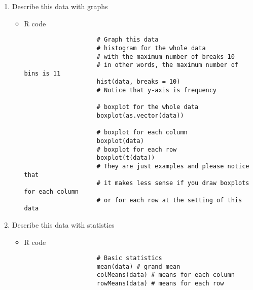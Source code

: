 \begin{enumerate}
\begin{itemize}
\begin{verbatim}
				# Show the data
				data
				\end{verbatim}
			\newpage \item R code (Directly inputing into R)
				\begin{verbatim}
					# Directly input a data as a matrix
					data <- matrix(c(
					74.03	,	74.002	,	74.019	,	73.992	,	74.008	,
					73.995	,	73.992	,	74.001	,	74.011	,	74.004	,
					73.988	,	74.024	,	74.021	,	74.005	,	74.002	,
					74.002	,	73.996	,	73.993	,	74.015	,	74.009	,
					73.992	,	74.007	,	74.015	,	73.989	,	74.014	,
					74.009	,	73.994	,	73.997	,	73.985	,	73.993	,
					73.995	,	74.006	,	73.994	,	74	,	74.005	,
					73.985	,	74.003	,	73.993	,	74.015	,	73.988	,
					74.008	,	73.995	,	74.009	,	74.005	,	74.004	,
					73.998	,	74	,	73.99	,	74.007	,	73.995	,
					73.994	,	73.998	,	73.994	,	73.995	,	73.99	,
					74.004	,	74	,	74.007	,	74	,	73.996	,
					73.983	,	74.002	,	73.998	,	73.997	,	74.012	,
					74.006	,	73.967	,	73.994	,	74	,	73.984	,
					74.012	,	74.014	,	73.998	,	73.999	,	74.007	,
					74	,	73.984	,	74.005	,	73.998	,	73.996	,
					73.994	,	74.012	,	73.986	,	74.005	,	74.007	,
					74.006	,	74.01	,	74.018	,	74.003	,	74	,
					73.984	,	74.002	,	74.003	,	74.005	,	73.997	,
					74	,	74.01	,	74.013	,	74.02	,	74.003	,
					73.982	,	74.001	,	74.015	,	74.005	,	73.996	,
					74.004	,	73.999	,	73.99	,	74.006	,	74.009	,
					74.01	,	73.989	,	73.99	,	74.009	,	74.014	,
					74.015	,	74.008	,	73.993	,	74	,	74.01	,
					73.982	,	73.984	,	73.995	,	74.017	,	74.013	
					), ncol = 5, byrow = T)
					
					# Show the data
					data
				\end{verbatim}
		\end{itemize}		
	\newpage \item Describe this data with graphs
		\begin{itemize}
			\item R code
				\begin{verbatim}
				 	# Graph this data
				 	# histogram for the whole data 
				 	# with the maximum number of breaks 10
				 	# in other words, the maximum number of bins is 11 
				 	hist(data, breaks = 10) 
				 	# Notice that y-axis is frequency
				 	
				 	# boxplot for the whole data
				 	boxplot(as.vector(data)) 
				 	
				 	# boxplot for each column
				 	boxplot(data) 
				 	# boxplot for each row
				 	boxplot(t(data))
				 	# They are just examples and please notice that 
				 	# it makes less sense if you draw boxplots for each column
				 	# or for each row at the setting of this data
				\end{verbatim}
		\end{itemize}
	\item Describe this data with statistics
		\begin{itemize}
			\item R code
				\begin{verbatim}
					# Basic statistics
					mean(data) # grand mean
					colMeans(data) # means for each column
					rowMeans(data) # means for each row
					

\end{verbatim}
\end{itemize}
\end{enumerate}
